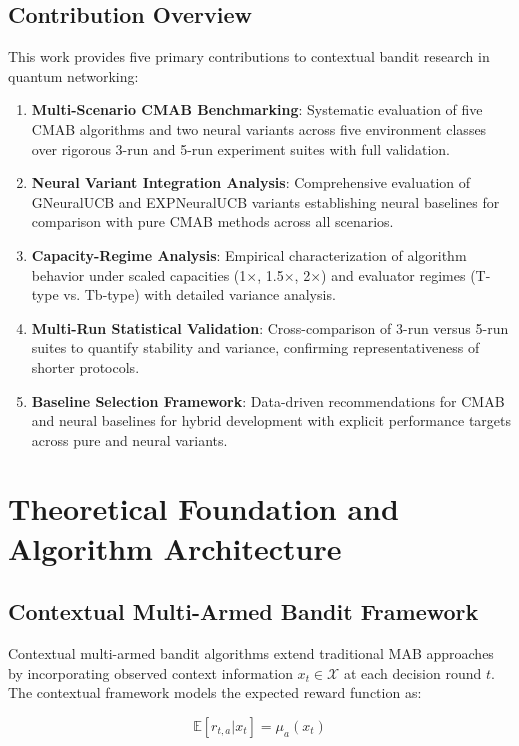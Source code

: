 \documentclass[12pt,a4paper]{article}
\begin{document}
\subsection{Contribution Overview}

This work provides five primary contributions to contextual bandit research in quantum networking:

\begin{enumerate}
\item \textbf{Multi-Scenario CMAB Benchmarking}: Systematic evaluation of five CMAB algorithms and two neural variants across five environment classes over rigorous 3-run and 5-run experiment suites with full validation.
\item \textbf{Neural Variant Integration Analysis}: Comprehensive evaluation of GNeuralUCB and EXPNeuralUCB variants establishing neural baselines for comparison with pure CMAB methods across all scenarios.
\item \textbf{Capacity-Regime Analysis}: Empirical characterization of algorithm behavior under scaled capacities (1$\times$, 1.5$\times$, 2$\times$) and evaluator regimes (T-type vs. Tb-type) with detailed variance analysis.
\item \textbf{Multi-Run Statistical Validation}: Cross-comparison of 3-run versus 5-run suites to quantify stability and variance, confirming representativeness of shorter protocols.
\item \textbf{Baseline Selection Framework}: Data-driven recommendations for CMAB and neural baselines for hybrid development with explicit performance targets across pure and neural variants.
\end{enumerate}

\newpage
\section{Theoretical Foundation and Algorithm Architecture}

\subsection{Contextual Multi-Armed Bandit Framework}

Contextual multi-armed bandit algorithms extend traditional MAB approaches by incorporating observed context information $x_t \in \mathcal{X}$ at each decision round $t$. The contextual framework models the expected reward function as:

\begin{equation}
\mathbb{E}[r_{t,a} | x_t] = \mu_a(x_t)
\end{equation}
\end{document}

